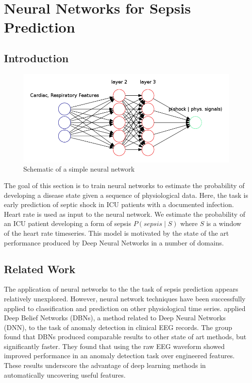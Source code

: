 \documentclass[12pt,solutions]{article}
\begin{document}
\section{Neural Networks for Sepsis Prediction}

\subsection{Introduction}

\begin{figure}[h!]
  \caption{Schematic of a simple neural network}
  \centering
    \includegraphics[width=1.0\textwidth]{nn_plots/nn}
\end{figure}

The goal of this section is to train neural networks to estimate the probability of developing a disease state given a sequence of
physiological data. Here, the task is early prediction of septic shock in ICU patients with a documented infection. Heart rate is used as input to the neural network. We estimate the probability of an ICU patient developing a form of sepsis $P(sepsis \mid S)$ where $S$ is a window of the 
heart rate timeseries. This model is motivated by the state of the art performance produced by Deep Neural Networks in a number of domains.


\subsection{Related Work}

The application of neural networks to the the task of sepsis prediction appears relatively unexplored. However, neural network techniques have been successfully applied to classification and prediction on other physiological time series. \cite{wulsin2011modeling} applied Deep Belief Networks (DBNs), a method related to Deep Neural Networks (DNN), to the task of anomaly detection in clinical EEG records. The group found that 
DBNs produced comparable results to other state of art methods, but significantly faster. They found
that using the raw EEG waveform showed improved performance in an
anomaly detection task over engineered features.
These results underscore the advantage of deep learning methods in 
automatically uncovering useful features. \\
\end{document}
